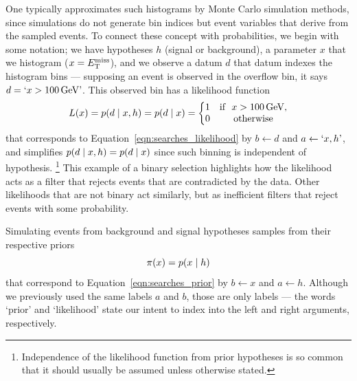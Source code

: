One typically approximates such histograms by Monte Carlo simulation methods,
since simulations do not generate bin indices but event variables that derive
from the sampled events.
To connect these concept with probabilities, we begin with some notation;
we have hypotheses $h$ (signal or background),
a parameter $x$ that we histogram ($x = \met$),
and we observe a datum $d$ that datum indexes the histogram bins --- supposing
an event is observed in the overflow bin, it says
$d = `x > 100\,\eV[G]\textrm{'}$.
This observed bin has a likelihood function
\begin{equation}
L(x) = \prob{d}{x, h} = \prob{d}{x} =
\left\{
\begin{matrix}
1 & \textrm{if }~x > 100\,\eV[G], \\
0 & \textrm{otherwise} \\
\end{matrix}
\right.
\end{equation}
that corresponds to Equation~\ref{eqn:searches_likelihood} by
$b \leftarrow d$ and $a \leftarrow `x, h\textrm{'}$,
and simplifies $\prob{d}{x, h} = \prob{d}{x}$ since such binning is independent
of hypothesis.%
\footnote{%
Independence of the likelihood function from prior hypotheses is so common
that it should usually be assumed unless otherwise stated.
}
This example of a binary selection highlights how the likelihood acts as a
filter that rejects events that are contradicted by the data.
Other likelihoods that are not binary act similarly, but as inefficient filters
that reject events with some probability.

Simulating events from background and signal hypotheses samples from their
respective priors
\begin{equation}
\pi(x) = \prob{x}{h}
\end{equation}
that correspond to Equation~\ref{eqn:searches_prior} by
$b \leftarrow x$ and $a \leftarrow h$.
Although we previously used the same labels $a$ and $b$, those are only
labels --- the words `prior' and `likelihood' state our intent to index into
the left and right arguments, respectively.

